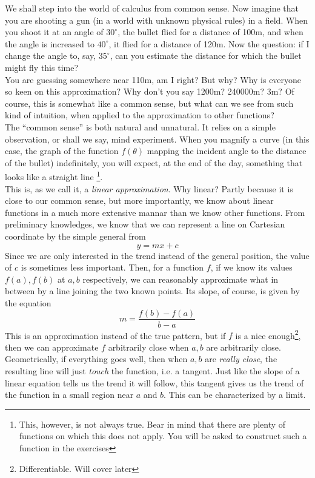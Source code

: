 We shall step into the world of calculus from common sense.
Now imagine that you are shooting a gun (in a world with unknown physical rules) in a field.
When you shoot it at an angle of $30^\circ$, the bullet flied for a distance of 100m, and when the angle is increased to $40^\circ$, it flied for a distance of 120m.
Now the question: if I change the angle to, say, $35^\circ$, can you estimate the distance for which the bullet might fly this time?\\
You are guessing somewhere near 110m, am I right? But why? Why is everyone so keen on this approximation? Why don't you say 1200m? 240000m? 3m?
Of course, this is somewhat like a common sense, but what can we see from such kind of intuition, when applied to the approximation to other functions?\\
The ``common sense'' is both natural and unnatural. It relies on a simple observation, or shall we say, mind experiment. When you magnify a curve (in this case, the graph of the function
$f(\theta)$ mapping the incident angle to the distance of the bullet) indefinitely, you will expect, at the end of the day, something that looks like a straight line
\footnote{This, however, is not always true. Bear in mind that there are plenty of functions on which this does not apply. You will be asked to construct such a function in the exercises}.\\
This is, as we call it, a \textit{linear approximation}. Why linear?
Partly because it is close to our common sense, but more importantly, we know about linear functions in a much more extensive mannar than we know other functions.
From preliminary knowledges, we know that we can represent a line on Cartesian coordinate by the simple general from
$$y=mx+c$$
Since we are only interested in the trend instead of the general position, the value of $c$ is sometimes less important.
Then, for a function $f$, if we know its values $f(a), f(b)$ at $a,b$ respectively, we can reasonably approximate what in between by a line joining the two known points.
Its slope, of course, is given by the equation
$$m=\frac{f(b)-f(a)}{b-a}$$
This is an approximation instead of the true pattern, but if $f$ is a nice enough\footnote{Differentiable. Will cover later}, then we can approximate $f$ arbitrarily close when $a,b$ are arbitrarily close.\\
Geometrically, if everything goes well, then when $a,b$ are \textit{really close}, the resulting line will just \textit{touch} the function, i.e. a tangent.
Just like the slope of a linear equation tells us the trend it will follow, this tangent gives us the trend of the function in a small region near $a$ and $b$. This can be characterized by a limit.
